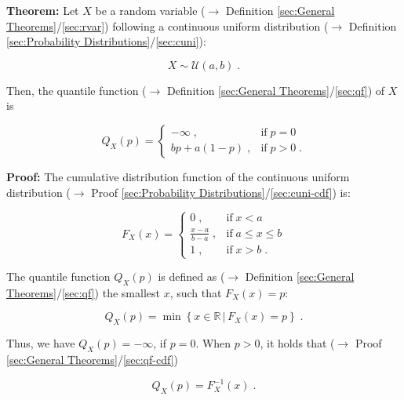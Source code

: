 \documentclass[a4paper,12pt,twoside]{book}
\begin{document}
\textbf{Theorem:} Let $X$ be a random variable ($\rightarrow$ Definition \ref{sec:General Theorems}/\ref{sec:rvar}) following a continuous uniform distribution ($\rightarrow$ Definition \ref{sec:Probability Distributions}/\ref{sec:cuni}):

\begin{equation} \label{eq:cuni-qf-cuni}
X \sim \mathcal{U}(a, b) \; .
\end{equation}

Then, the quantile function ($\rightarrow$ Definition \ref{sec:General Theorems}/\ref{sec:qf}) of $X$ is

\begin{equation} \label{eq:cuni-qf-cuni-qf}
Q_X(p) = \left\{
\begin{array}{rl}
-\infty \; , & \text{if} \; p = 0 \\
bp + a(1-p) \; , & \text{if} \; p > 0 \; .
\end{array}
\right.
\end{equation}


\vspace{1em}
\textbf{Proof:} The cumulative distribution function of the continuous uniform distribution ($\rightarrow$ Proof \ref{sec:Probability Distributions}/\ref{sec:cuni-cdf}) is:

\begin{equation} \label{eq:cuni-qf-cuni-cdf}
F_X(x) = \left\{
\begin{array}{rl}
0 \; , & \text{if} \; x < a \\
\frac{x-a}{b-a} \; , & \text{if} \; a \leq x \leq b \\
1 \; , & \text{if} \; x > b \; .
\end{array}
\right.
\end{equation}

The quantile function $Q_X(p)$ is defined as ($\rightarrow$ Definition \ref{sec:General Theorems}/\ref{sec:qf}) the smallest $x$, such that $F_X(x) = p$:

\begin{equation} \label{eq:cuni-qf-qf}
Q_X(p) = \min \left\lbrace x \in \mathbb{R} \, \vert \, F_X(x) = p \right\rbrace \; .
\end{equation}

Thus, we have $Q_X(p) = -\infty$, if $p = 0$. When $p > 0$, it holds that ($\rightarrow$ Proof \ref{sec:General Theorems}/\ref{sec:qf-cdf})

\begin{equation} \label{eq:cuni-qf-exp-qf-s1}
Q_X(p) = F_X^{-1}(x) \; .
\end{equation}
\end{document}
